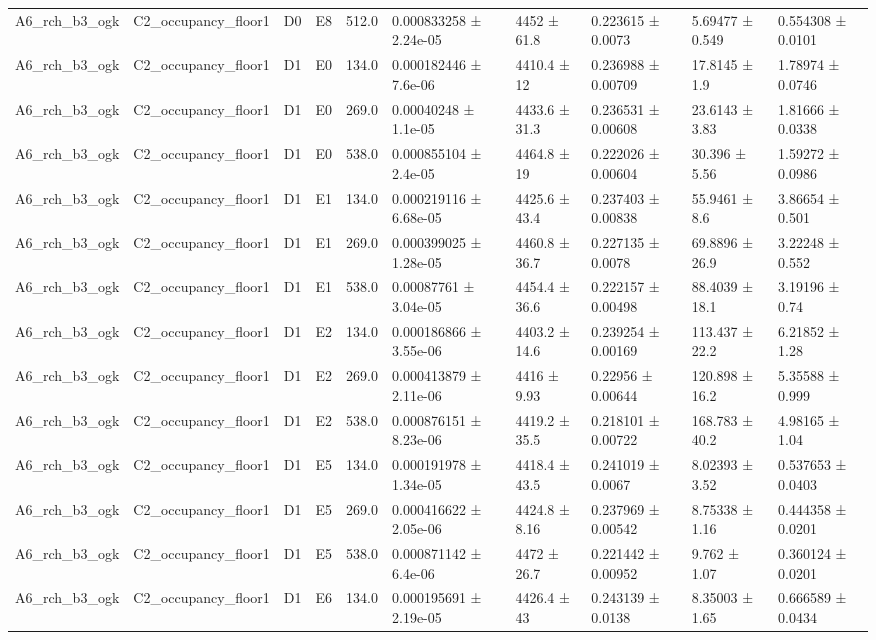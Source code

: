 \begin{table}
\begin{tabular}{llllllllll}
A6\_rch\_b3\_ogk & C2\_occupancy\_floor1 & D0 & E8 & 512.0 & 0.000833258 ± 2.24e-05 & 4452 ± 61.8 & 0.223615 ± 0.0073 & 5.69477 ± 0.549 & 0.554308 ± 0.0101 \\
A6\_rch\_b3\_ogk & C2\_occupancy\_floor1 & D1 & E0 & 134.0 & 0.000182446 ± 7.6e-06 & 4410.4 ± 12 & 0.236988 ± 0.00709 & 17.8145 ± 1.9 & 1.78974 ± 0.0746 \\
A6\_rch\_b3\_ogk & C2\_occupancy\_floor1 & D1 & E0 & 269.0 & 0.00040248 ± 1.1e-05 & 4433.6 ± 31.3 & 0.236531 ± 0.00608 & 23.6143 ± 3.83 & 1.81666 ± 0.0338 \\
A6\_rch\_b3\_ogk & C2\_occupancy\_floor1 & D1 & E0 & 538.0 & 0.000855104 ± 2.4e-05 & 4464.8 ± 19 & 0.222026 ± 0.00604 & 30.396 ± 5.56 & 1.59272 ± 0.0986 \\
A6\_rch\_b3\_ogk & C2\_occupancy\_floor1 & D1 & E1 & 134.0 & 0.000219116 ± 6.68e-05 & 4425.6 ± 43.4 & 0.237403 ± 0.00838 & 55.9461 ± 8.6 & 3.86654 ± 0.501 \\
A6\_rch\_b3\_ogk & C2\_occupancy\_floor1 & D1 & E1 & 269.0 & 0.000399025 ± 1.28e-05 & 4460.8 ± 36.7 & 0.227135 ± 0.0078 & 69.8896 ± 26.9 & 3.22248 ± 0.552 \\
A6\_rch\_b3\_ogk & C2\_occupancy\_floor1 & D1 & E1 & 538.0 & 0.00087761 ± 3.04e-05 & 4454.4 ± 36.6 & 0.222157 ± 0.00498 & 88.4039 ± 18.1 & 3.19196 ± 0.74 \\
A6\_rch\_b3\_ogk & C2\_occupancy\_floor1 & D1 & E2 & 134.0 & 0.000186866 ± 3.55e-06 & 4403.2 ± 14.6 & 0.239254 ± 0.00169 & 113.437 ± 22.2 & 6.21852 ± 1.28 \\
A6\_rch\_b3\_ogk & C2\_occupancy\_floor1 & D1 & E2 & 269.0 & 0.000413879 ± 2.11e-06 & 4416 ± 9.93 & 0.22956 ± 0.00644 & 120.898 ± 16.2 & 5.35588 ± 0.999 \\
A6\_rch\_b3\_ogk & C2\_occupancy\_floor1 & D1 & E2 & 538.0 & 0.000876151 ± 8.23e-06 & 4419.2 ± 35.5 & 0.218101 ± 0.00722 & 168.783 ± 40.2 & 4.98165 ± 1.04 \\
A6\_rch\_b3\_ogk & C2\_occupancy\_floor1 & D1 & E5 & 134.0 & 0.000191978 ± 1.34e-05 & 4418.4 ± 43.5 & 0.241019 ± 0.0067 & 8.02393 ± 3.52 & 0.537653 ± 0.0403 \\
A6\_rch\_b3\_ogk & C2\_occupancy\_floor1 & D1 & E5 & 269.0 & 0.000416622 ± 2.05e-06 & 4424.8 ± 8.16 & 0.237969 ± 0.00542 & 8.75338 ± 1.16 & 0.444358 ± 0.0201 \\
A6\_rch\_b3\_ogk & C2\_occupancy\_floor1 & D1 & E5 & 538.0 & 0.000871142 ± 6.4e-06 & 4472 ± 26.7 & 0.221442 ± 0.00952 & 9.762 ± 1.07 & 0.360124 ± 0.0201 \\
A6\_rch\_b3\_ogk & C2\_occupancy\_floor1 & D1 & E6 & 134.0 & 0.000195691 ± 2.19e-05 & 4426.4 ± 43 & 0.243139 ± 0.0138 & 8.35003 ± 1.65 & 0.666589 ± 0.0434 \\

\end{tabular}
\end{table}
